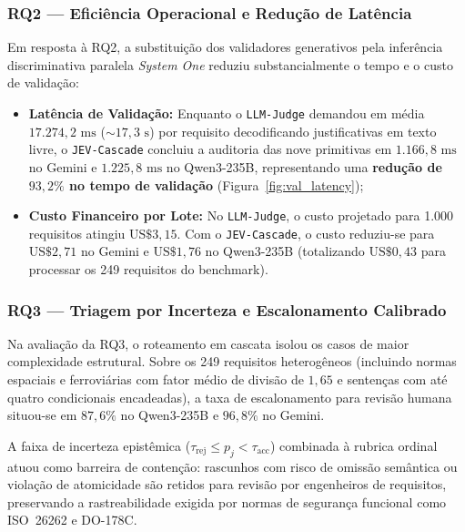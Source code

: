 \subsubsection{RQ2 --- Eficiência Operacional e Redução de Latência}
Em resposta à RQ2, a substituição dos validadores generativos pela inferência discriminativa paralela \textit{System One} reduziu substancialmente o tempo e o custo de validação:
\begin{itemize}
    \item \textbf{Latência de Validação:} Enquanto o \texttt{LLM-Judge} demandou em média $17.274{,}2\text{ ms}$ ($\sim 17{,}3\text{ s}$) por requisito decodificando justificativas em texto livre, o \texttt{JEV-Cascade} concluiu a auditoria das nove primitivas em \textbf{$1.166{,}8\text{ ms}$} no Gemini e \textbf{$1.225{,}8\text{ ms}$} no Qwen3-235B, representando uma \textbf{redução de $93{,}2\%$ no tempo de validação} (Figura~\ref{fig:val_latency});
    \item \textbf{Custo Financeiro por Lote:} No \texttt{LLM-Judge}, o custo projetado para 1.000 requisitos atingiu $\text{US\$ } 3{,}15$. Com o \texttt{JEV-Cascade}, o custo reduziu-se para \textbf{$\text{US\$ } 2{,}71$} no Gemini e \textbf{$\text{US\$ } 1{,}76$} no Qwen3-235B (totalizando $\text{US\$ } 0{,}43$ para processar os 249 requisitos do benchmark).
\end{itemize}

\subsubsection{RQ3 --- Triagem por Incerteza e Escalonamento Calibrado}
Na avaliação da RQ3, o roteamento em cascata isolou os casos de maior complexidade estrutural. Sobre os 249 requisitos heterogêneos (incluindo normas espaciais e ferroviárias com fator médio de divisão de $1{,}65$ e sentenças com até quatro condicionais encadeadas), a taxa de escalonamento para revisão humana situou-se em $87{,}6\%$ no Qwen3-235B e $96{,}8\%$ no Gemini.

A faixa de incerteza epistêmica ($\tau_{\text{rej}} \le p_j < \tau_{\text{acc}}$) combinada à rubrica ordinal atuou como barreira de contenção: rascunhos com risco de omissão semântica ou violação de atomicidade são retidos para revisão por engenheiros de requisitos, preservando a rastreabilidade exigida por normas de segurança funcional como ISO~26262 e DO-178C.

